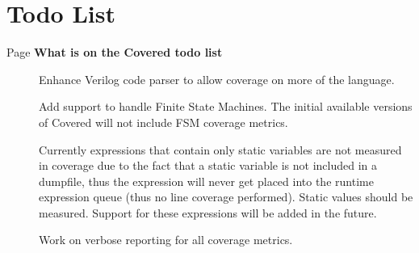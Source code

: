 \section{Todo List}\label{todo}
\begin{description}
\item[\label{_todo000001}
Page {\bf What is on the Covered todo list} ]
Enhance Verilog code parser to allow coverage on more of the language. 

Add support to handle Finite State Machines. The initial available versions of Covered will not include FSM coverage metrics. 

Currently expressions that contain only static variables are not measured in coverage due to the fact that a static variable is not included in a dumpfile, thus the expression will never get placed into the runtime expression queue (thus no line coverage performed). Static values should be measured. Support for these expressions will be added in the future. 

 Work on verbose reporting for all coverage metrics. \end{description}
 